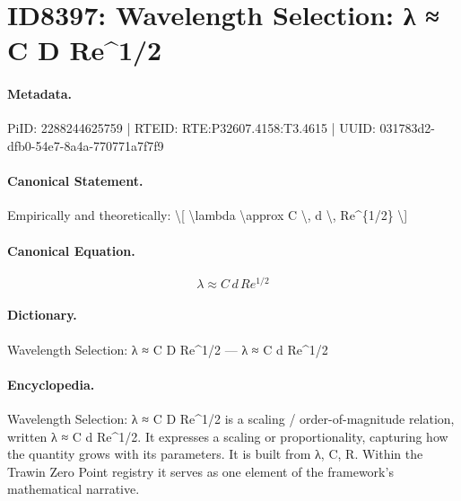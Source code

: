 \section*{ID8397: Wavelength Selection: λ ≈ C D Re\textasciicircum{}1/2}
\paragraph{Metadata.}
PiID: 2288244625759 | RTEID: RTE:P32607.4158:T3.4615 | UUID: 031783d2-dfb0-54e7-8a4a-770771a7f7f9

\paragraph{Canonical Statement.}
Empirically and theoretically: \textbackslash{}[ \textbackslash{}lambda \textbackslash{}approx C \textbackslash{}, d \textbackslash{}, Re\textasciicircum{}\{1/2\} \textbackslash{}]

\paragraph{Canonical Equation.}
\[
\lambda \approx C \, d \, Re^{1/2}
\]

\paragraph{Dictionary.}
Wavelength Selection: λ ≈ C D Re\textasciicircum{}1/2 — λ ≈ C d Re\textasciicircum{}1/2

\paragraph{Encyclopedia.}
Wavelength Selection: λ ≈ C D Re\textasciicircum{}1/2 is a scaling / order-of-magnitude relation, written λ ≈ C d Re\textasciicircum{}1/2. It expresses a scaling or proportionality, capturing how the quantity grows with its parameters. It is built from λ, C, R. Within the Trawin Zero Point registry it serves as one element of the framework's mathematical narrative.
